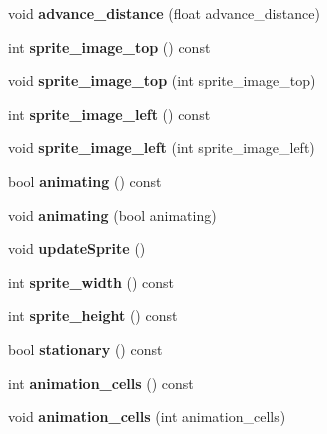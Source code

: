 \begin{DoxyCompactItemize}
\mbox{\label{class_sprite_a91d7d4c46a38c58fa1ef05c4132e5fcf}} 
void {\bfseries advance\+\_\+distance} (float advance\+\_\+distance)
\item 
\mbox{\label{class_sprite_a4482fc0a1581aaf91c97175a79be319a}} 
int {\bfseries sprite\+\_\+image\+\_\+top} () const
\item 
\mbox{\label{class_sprite_a7f5f82520ed2901d7fc89f01d981a49f}} 
void {\bfseries sprite\+\_\+image\+\_\+top} (int sprite\+\_\+image\+\_\+top)
\item 
\mbox{\label{class_sprite_a9a139be20b5b5a5237c9a81b36f625f8}} 
int {\bfseries sprite\+\_\+image\+\_\+left} () const
\item 
\mbox{\label{class_sprite_a92d9872ab695420bc81ede2a9425aeea}} 
void {\bfseries sprite\+\_\+image\+\_\+left} (int sprite\+\_\+image\+\_\+left)
\item 
\mbox{\label{class_sprite_af9153229a8327b4d247ef16448c1cb35}} 
bool {\bfseries animating} () const
\item 
\mbox{\label{class_sprite_a1a3df748d6a3469d1b79cde39adb8ebc}} 
void {\bfseries animating} (bool animating)
\item 
\mbox{\label{class_sprite_a511c565998b09ebebc83c0205bd54f77}} 
void {\bfseries update\+Sprite} ()
\item 
\mbox{\label{class_sprite_acdba2a71fac359258d583bcdc2648cdd}} 
int {\bfseries sprite\+\_\+width} () const
\item 
\mbox{\label{class_sprite_a767f74c47c154fccb06d815a1ba33561}} 
int {\bfseries sprite\+\_\+height} () const
\item 
\mbox{\label{class_sprite_acebb5f6a962000aae733d919e2a6392d}} 
bool {\bfseries stationary} () const
\item 
\mbox{\label{class_sprite_ab05f29a527cec4d079c1ed74c8980d3c}} 
int {\bfseries animation\+\_\+cells} () const
\item 
\mbox{\label{class_sprite_a54ab5cb9dc016b0fc26eb465b3b792c3}} 
void {\bfseries animation\+\_\+cells} (int animation\+\_\+cells)
\end{DoxyCompactItemize}
